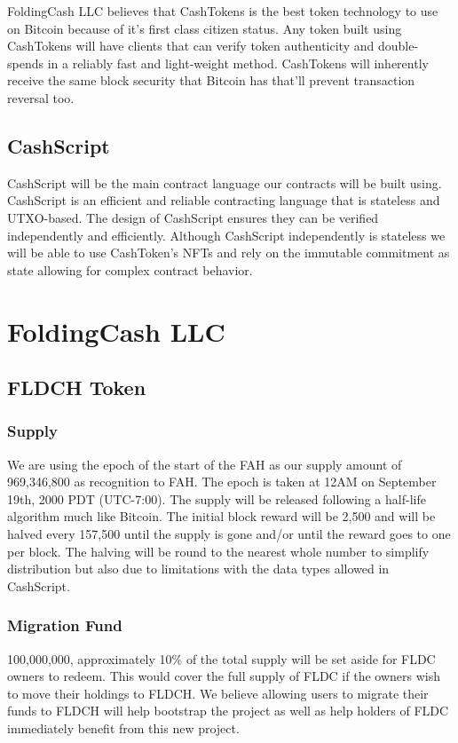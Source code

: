 \documentclass[letterpaper,12pt,titlepage]{article}
\def\org{FoldingCash LLC}
\def\ticker{FLDCH}
\def\tokenSupply{969,346,800}
\def\initReward{2,500}
\def\halvingLength{157,500}
\def\migrationFund{100,000,000}
\def\fahLaunchEpoch{12AM on September 19th, 2000 PDT (UTC-7:00)}
\begin{document}
\org{} believes that CashTokens is the best token technology to use on Bitcoin because of it's first class citizen status. Any token built using CashTokens will have clients that can verify token authenticity and double-spends in a reliably fast and light-weight method. CashTokens will inherently receive the same block security that Bitcoin has that'll prevent transaction reversal too.

\subsection{CashScript}
CashScript will be the main contract language our contracts will be built using. CashScript is an efficient and reliable contracting language that is stateless and UTXO-based. The design of CashScript ensures they can be verified independently and efficiently. Although CashScript independently is stateless we will be able to use CashToken's NFTs and rely on the immutable commitment as state allowing for complex contract behavior.

\section{\org{}}

\subsection{\ticker{} Token}

\subsubsection{Supply}
We are using the epoch of the start of the FAH as our supply amount of \tokenSupply{} as recognition to FAH. The epoch is taken at \fahLaunchEpoch{}. The supply will be released following a half-life algorithm much like Bitcoin. The initial block reward will be \initReward{} and will be halved every \halvingLength{} until the supply is gone and/or until the reward goes to one per block. The halving will be round to the nearest whole number to simplify distribution but also due to limitations with the data types allowed in CashScript.

\subsubsection{Migration Fund}
\migrationFund{}, approximately 10\% of the total supply will be set aside for FLDC owners to redeem. This would cover the full supply of FLDC if the owners wish to move their holdings to \ticker{}. We believe allowing users to migrate their funds to \ticker{} will help bootstrap the project as well as help holders of FLDC immediately benefit from this new project.
\end{document}
